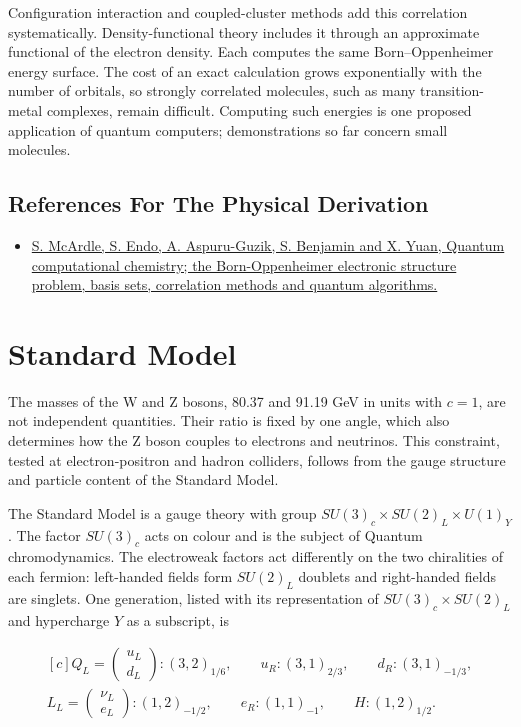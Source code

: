 \documentclass[11pt,oneside]{book}
\newenvironment{centeredalign}{\[\begin{gathered}[c]}{\end{gathered}\]}
\begin{document}
Configuration interaction and coupled-cluster methods add this correlation systematically. Density-functional theory includes it through an approximate functional of the electron density. Each computes the same Born--Oppenheimer energy surface. The cost of an exact calculation grows exponentially with the number of orbitals, so strongly correlated molecules, such as many transition-metal complexes, remain difficult. Computing such energies is one proposed application of quantum computers; demonstrations so far concern small molecules.

\subsection*{References For The Physical Derivation}
\begin{itemize}
\item \href{https://arxiv.org/abs/1808.10402}{S. McArdle, S. Endo, A. Aspuru-Guzik, S. Benjamin and X. Yuan, Quantum computational chemistry; the Born-Oppenheimer electronic structure problem, basis sets, correlation methods and quantum algorithms.}
\end{itemize}





\clearpage

\section{Standard Model}

\label{topic:standard-model}

The masses of the W and Z bosons, 80.37 and 91.19 GeV in units with \(c=1\), are not independent quantities. Their ratio is fixed by one angle, which also determines how the Z boson couples to electrons and neutrinos. This constraint, tested at electron-positron and hadron colliders, follows from the gauge structure and particle content of the Standard Model.

The Standard Model is a gauge theory with group \(SU(3)_c\times SU(2)_L\times U(1)_Y\). The factor \(SU(3)_c\) acts on colour and is the subject of Quantum chromodynamics. The electroweak factors act differently on the two chiralities of each fermion: left-handed fields form \(SU(2)_L\) doublets and right-handed fields are singlets. One generation, listed with its representation of \(SU(3)_c\times SU(2)_L\) and hypercharge \(Y\) as a subscript, is

\begin{centeredalign}
Q_L=\begin{pmatrix}u_L\\d_L\end{pmatrix}:(3,2)_{1/6},\qquad
u_R:(3,1)_{2/3},\qquad d_R:(3,1)_{-1/3},\\
L_L=\begin{pmatrix}\nu_L\\e_L\end{pmatrix}:(1,2)_{-1/2},\qquad
e_R:(1,1)_{-1},\qquad H:(1,2)_{1/2}.
\end{centeredalign}
\end{document}
